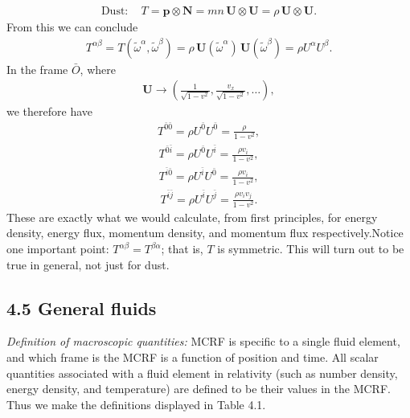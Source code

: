 \documentclass[12pt]{book}
\begin{document}
    \begin{align}
    \text{Dust}: \quad T = \mathbf{p} \otimes \mathbf{N} = mn \, \mathbf{U} \otimes \mathbf{U} = \rho \, \mathbf{U} \otimes \mathbf{U}. \tag{4.19}
    \end{align}
    From this we can conclude
    \begin{align}
    T^{\alpha\beta} = T(\tilde{\omega}^\alpha, \tilde{\omega}^\beta) = \rho \, \mathbf{U}(\tilde{\omega}^\alpha) \, \mathbf{U}(\tilde{\omega}^\beta) = \rho U^\alpha U^\beta. \tag{4.20}
    \end{align}
    In the frame \(\bar{O}\), where
    \begin{align}
    \mathbf{U} \rightarrow \left(\frac{1}{\sqrt{1 - v^2}}, \frac{v_x}{\sqrt{1 - v^2}}, \ldots \right),
    \end{align}
    we therefore have
    \begin{align}
    T^{\bar{0}\bar{0}} = \rho U^{\bar{0}} U^{\bar{0}} = \frac{\rho}{1 - v^2},
    \end{align}
    \begin{align}
    T^{\bar{0}\bar{i}} = \rho U^{\bar{0}} U^{\bar{i}} = \frac{\rho v_i}{1 - v^2},
    \end{align}
    \begin{align}
    T^{\bar{i}\bar{0}} = \rho U^{\bar{i}} U^{\bar{0}} = \frac{\rho v_i}{1 - v^2},
    \end{align}
    \begin{align}
    T^{\bar{i}\bar{j}} = \rho U^{\bar{i}} U^{\bar{j}} = \frac{\rho v_i v_j}{1 - v^2}.
    \tag{4.21}
    \end{align}
    These are exactly what we would calculate, from first principles, for energy density, energy flux, momentum density, and momentum flux respectively.Notice one important point: \(T^{\alpha\beta} = T^{\beta\alpha}\); that is, \(T\) is symmetric. This will turn out to be true in general, not just for dust.
    
    \subsection{4.5 General fluids}

    \textit{Definition of macroscopic quantities:}
    MCRF is specific to a single fluid element, and which frame is the MCRF is a function of position and time. All scalar quantities associated with a fluid element in relativity (such as number density, energy density, and temperature) are defined to be their values in the MCRF. Thus we make the definitions displayed in Table 4.1.
\end{document}
